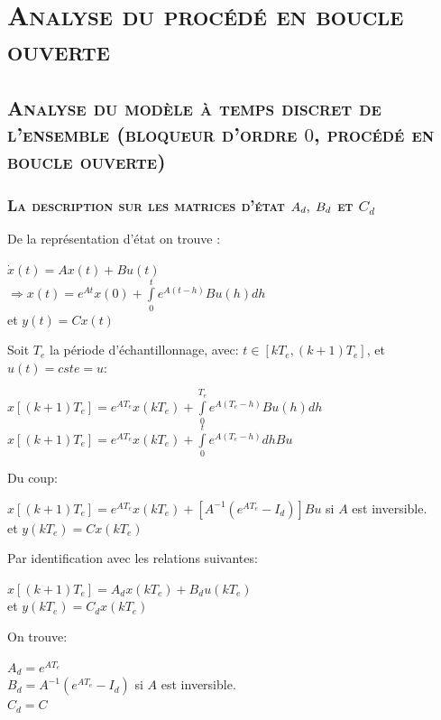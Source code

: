 \chapter{\textsc{Analyse du procédé en boucle ouverte}}
\section{\textsc{ Analyse du modèle à temps discret de l'ensemble (bloqueur d'ordre $0$, procédé en boucle ouverte) }}
\subsection{\textsc{La description sur les matrices d'état $ A_d,\hspace{1mm}B_d $ et $ C_d $ }}

De la représentation d'état on trouve :
	\begin{center}
		$ \dot{x}(t)=Ax(t)+Bu(t)$\\
 		$ \Longrightarrow  x(t) = e^{At} x(0) + \overset{t}{\underset{0}{ \int }} e^{ A(t-h)} Bu(h) dh $\\
 		et $y(t)=Cx(t) $
	\end{center}
Soit $T_e$ la période d'échantillonnage, avec: $t \in [kT_e,(k+1)T_e]$, et $u(t)=cste=u$:\\

	\begin{center}
		$ x[(k+1)T_e] = e^{AT_e} x(kT_e) + \overset{T_e}{\underset{0}{ \int }} e^{ A(T_e-h)} Bu(h) dh $\\
 		$ x[(k+1)T_e] = e^{AT_e} x(kT_e) +  \overset{t}{\underset{0}{ \int }} e^{ A(T_e-h)}dh Bu $ \\[0.5 cm]
 		\end{center}
 		
 		Du coup: \\
 		\begin{center}
 		$ x[(k+1)T_e] = e^{AT_e} x(kT_e) + [A^{-1}(e^{AT_e}-I_d)] Bu $ si $A$ est inversible.\\[0.25 cm]
 		et $y(kT_e)=Cx(kT_e)$
	\end{center}
Par identification avec les relations suivantes:\\ 
	\begin{center}
		$ x[(k+1)T_e] = A_d x(kT_e) + B_d u(kT_e) $\\
 		et $y(kT_e)=C_d x(kT_e)$\\
	\end{center}	
On trouve: 
	\begin{center}
		$ A_d = e^{AT_e} $\\
		$ B_d = A^{-1}(e^{AT_e}-I_d) $ si $A$ est inversible.\\  
 		$ C_d = C $
	\end{center}


